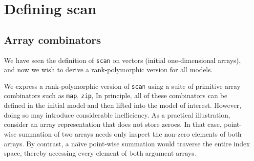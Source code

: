 \section{Defining scan}



\subsection{\label{sec:comb}Array combinators}
We have seen the definition of \texttt{scan} on vectors (initial
one-dimensional arrays), and now we wish to derive a rank-polymorphic version
for all models.

We express a rank-polymorphic version of \texttt{scan} using a suite of
primitive array combinators such as \texttt{map}, \texttt{zip}, \etc{} In
principle, all of these combinators can be defined in the initial model and
then lifted into the model of interest.  However, doing so may introduce
considerable inefficiency.  As a practical illustration, consider an array
representation that does not store zeroes.  In that case, point-wise summation
of two arrays needs only inspect the non-zero elements of both arrays.  By
contrast, a na\"{\i}ve point-wise summation would traverse the entire index space,
thereby accessing every element of both argument arrays.

